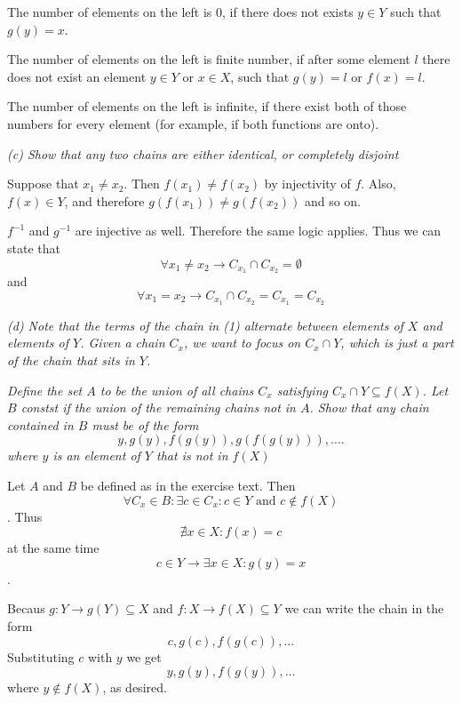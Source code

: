 \documentclass[11pt,oneside,titlepage]{article}
\begin{document}
The number of elements on the left is 0, if there does not exists $y \in Y$ such that
$g(y) = x$.

The number of elements on the left is finite number, if after some element $l$ there
does not exist an element $y \in Y$ or $x \in X$, such that $g(y) = l$ or $f(x) = l$.

The number of elements on the left is infinite, if there exist both of those numbers
for every element (for example, if both functions are onto).







\textit{(c) Show that any two chains are either identical, or completely disjoint}

Suppose that $x_1 \neq x_2$. Then $f(x_1) \neq f(x_2)$ by injectivity of $f$.
Also, $f(x) \in Y$, and therefore $g(f(x_1)) \neq g(f(x_2))$ and so on.

$f^{-1}$ and $g^{-1}$ are injective as well. Therefore the same logic applies. Thus
we can state that
$$\forall x_1 \neq x_2 \to C_{x_1} \cap C_{x_2} = \emptyset $$
and
$$\forall x_1 = x_2 \to C_{x_1} \cap C_{x_2} = C_{x_1} = C_{x_2} $$

\textit{(d) Note that the terms of the chain in (1) alternate between elements of $X$
  and elements of $Y$. Given a chain $C_x$, we want to focus on $C_x \cap Y$,
  which is just a part of the chain that sits in $Y$.}

\textit{Define the set $A$ to be the union of all chains $C_x$ satisfying
  $C_x \cap Y \subseteq f(X)$. Let $B$ constst if the union of the remaining chains not
  in $A$. Show that any chain contained in $B$ must be of the form}
$$y, g(y), f(g(y)), g(f(g(y))), ....$$
\textit{where $y$ is an element of $Y$ that is not in $f(X)$}

Let $A$ and $B$ be defined as in the exercise text. Then
$$\forall C_x \in B: \exists c \in C_x: c \in Y \text{ and } c \notin f(X)$$.
Thus
$$\nexists x \in X: f(x) = c$$
at the same time
$$c \in Y \to \exists x \in X: g(y) = x$$.

Becaus $g: Y \to g(Y) \subseteq X$ and $f: X \to f(X) \subseteq Y$ we can write
the chain in the form 
$$c, g(c), f(g(c)), ...$$
Substituting $c$ with $y$ we get 
$$y, g(y), f(g(y)), ...$$
where $y \notin f(X)$, as desired.
\end{document}

